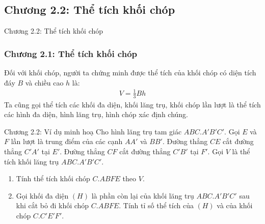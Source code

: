 \subsection{Chương 2.2: Thể tích khối chóp}
\begin{frame}{Chương 2.2: Thể tích khối chóp}
    \frametitle{Chương 2.1: Thể tích khối chóp}
Đối với khối chóp, người ta chứng minh được thể tích của khối chóp có diện tích đáy \( B \) và chiều cao \( h \) là:
\begin{eqnarray}
    V = \frac{1}{3} Bh
\end{eqnarray}
Ta cũng gọi thể tích các khối đa diện, khối lăng trụ, khối chóp lần lượt là thể tích các hình đa diện, hình lăng trụ, hình chóp xác định chúng.
\end{frame}
\begin{frame}{Chương 2.2: Ví dụ minh hoạ}
Cho hình lăng trụ tam giác $ABC.A'B'C'$. Gọi $E$ và $F$ lần lượt là trung điểm của các cạnh $AA'$ và $BB'$. Đường thẳng $CE$ cắt đường thẳng $C'A'$ tại $E'$. Đường thẳng $CF$ cắt đường thẳng $C'B'$ tại $F'$. Gọi $V$ là thể tích khối lăng trụ $ABC.A'B'C'$.

\begin{enumerate}[label=(\alph*)]
    \item Tính thể tích khối chóp $C.ABFE$ theo $V$.
    \item Gọi khối đa diện $(H)$ là phần còn lại của khối lăng trụ $ABC.A'B'C'$ sau khi cắt bỏ đi khối chóp $C.ABFE$. Tính tỉ số thể tích của $(H)$ và của khối chóp $C.C'E'F'$.
\end{enumerate}
\end{frame}
